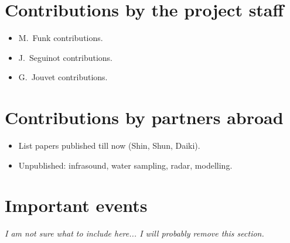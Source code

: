\documentclass{article}
\begin{document}
\section{Contributions by the project staff}

\begin{itemize}
\item M.~Funk contributions.
\item J.~Seguinot contributions.
\item G.~Jouvet contributions.
\end{itemize}

\section{Contributions by partners abroad}

\begin{itemize}
\item List papers published till now (Shin, Shun, Daiki).
\item Unpublished: infrasound, water sampling, radar, modelling.
\end{itemize}

\section{Important events}

\emph{I am not sure what to include here...
      I will probably remove this section.}

\end{document}
